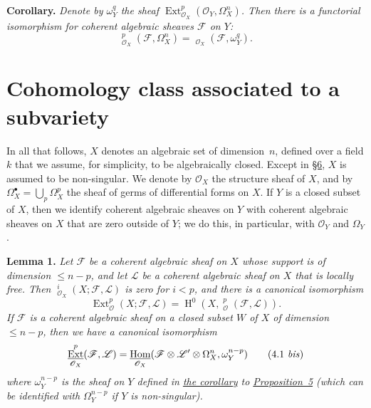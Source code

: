 \documentclass{article}
\newenvironment{itenv}[1]
  {\phantomsection\par\medskip\noindent\textbf{#1.}\itshape}
  {\medskip}
\newcommand{\scr}[1]{{\mathscr{#1}}}
\renewcommand{\leq}{\leqslant}
\DeclareMathOperator{\Ext}{Ext}
\DeclareMathOperator{\shExt}{\underline{Ext}}
\DeclareMathOperator{\shHom}{\underline{Hom}}
\DeclareMathOperator{\HH}{H}
\begin{document}
\begin{itenv}{Corollary}
\label{proposition5corollary}
  Denote by $\omega_Y^q$ the sheaf $\Ext_{\scr{O}_X}^p(\scr{O}_Y,\Omega_X^n)$.
  Then there is a functorial isomorphism for coherent algebraic sheaves $\scr{F}$ on $Y$:
  \[
  \label{3.8}
    \shExt_{\scr{O}_X}^p(\scr{F},\Omega_X^n) = \shHom_{\scr{O}_X}(\scr{F},\omega_Y^q).
  \tag{3.8}
  \]
\end{itenv}


\section{Cohomology class associated to a subvariety}
\label{section4}

In all that follows, $X$ denotes an algebraic set of dimension~$n$, defined over a field $k$ that we assume, for simplicity, to be algebraically closed.
Except in \hyperref[section6]{\S6}, $X$ is assumed to be non-singular.
We denote by $\scr{O}_X$ the structure sheaf of $X$, and by $\Omega_X^\bullet=\bigcup_p\Omega_X^p$ the sheaf of germs of differential forms on $X$.
If $Y$ is a closed subset of $X$, then we identify coherent algebraic sheaves on $Y$ with coherent algebraic sheaves on $X$ that are zero outside of $Y$;
we do this, in particular, with $\scr{O}_Y$ and $\Omega_Y$.

\begin{itenv}{Lemma 1}
\label{lemma1}
  Let $\scr{F}$ be a coherent algebraic sheaf on $X$ whose support is of dimension $\leq n-p$, and let $\scr{L}$ be a coherent algebraic sheaf on $X$ that is locally free.
  Then $\shExt_{\scr{O}_X}^i(X;\scr{F},\scr{L})$ is zero for $i<p$, and there is a canonical isomorphism
  \[
  \label{4.1}
    \Ext_\scr{O}^p(X;\scr{F},\scr{L}) = \HH^0(X,\shExt_\scr{O}^p(\scr{F},\scr{L})).
  \tag{4.1}
  \]
  If $\scr{F}$ is a coherent algebraic sheaf on a closed subset $W$ of $X$ of dimension $\leq n-p$, then we have a canonical isomorphism
  \[
  \label{4.1bis}
    \shExt_{\scr{O}_X}^p(\scr{F},\scr{L}) = \shHom_{\scr{O}_X}(\scr{F}\otimes\scr{L}'\otimes\Omega_X^n,\omega_Y^{n-p})
  \tag{4.1 \emph{bis}}
  \]
  where $\omega_Y^{n-p}$ is the sheaf on $Y$ defined in \hyperref[proposition5corollary]{the corollary} to \hyperref[proposition5]{Proposition~5} (which can be identified with $\Omega_Y^{n-p}$ if $Y$ is non-singular).
\end{itenv}
\end{document}

